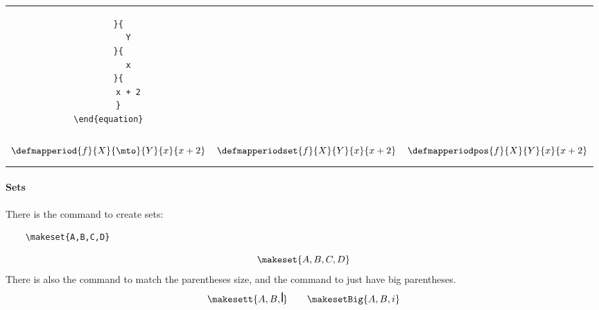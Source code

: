 \begin{widepar}
\begin{tabular}{|c|c|c|}
\begin{minipage}{0.3\textwidth}
\begin{verbatim}
    }{
        Y
    }{
        x
    }{
        x + 2
    }
\end{equation}
            \end{verbatim}
        \end{minipage}
        \\
        \begin{minipage}{0.3\textwidth}
            \begin{equation}
                \defmapperiod{
                    f
                }{
                    X
                }{
                    \mto
                }{
                    Y
                }{
                    x
                }{
                    x + 2
                }
            \end{equation}
        \end{minipage}
         &
        \begin{minipage}{0.3\textwidth}
            \begin{equation}
                \defmapperiodset{
                    f
                }{
                    X
                }{
                    Y
                }{
                    x
                }{
                    x + 2
                }
            \end{equation}
        \end{minipage}
         &
        \begin{minipage}{0.3\textwidth}
            \begin{equation}
                \defmapperiodpos{
                    f
                }{
                    X
                }{
                    Y
                }{
                    x
                }{
                    x + 2
                }
            \end{equation}
        \end{minipage}
        \\\hline
    \end{tabular}
\end{widepar}

\vfill\pagebreak

\paragraph{Sets}
There is the command \str{\makeset} to create sets:
\begin{verbatim}
    \makeset{A,B,C,D}
\end{verbatim}
\begin{equation}
    \makeset{A,B,C,D}
\end{equation}
There is also the command \str{\makesett} to match the parentheses size, and the command\linebreak[1] \str{\makesetBig} to just have big parentheses.
\begin{equation}
    \makesett{A, B, \rule{1pt}{10pt}}
    \qquad
    \makesetBig{A, B, i}
\end{equation}

